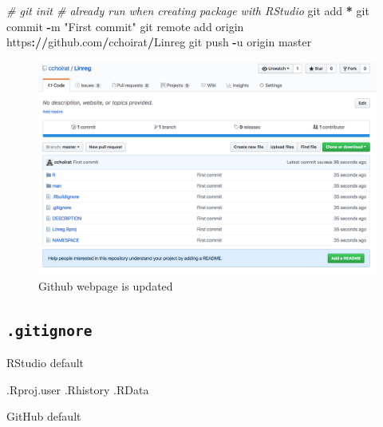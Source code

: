 \documentclass[]{book}
\newenvironment{Shaded}{\begin{snugshade}}{\end{snugshade}}
\newcommand{\StringTok}[1]{\textcolor[rgb]{0.31,0.60,0.02}{#1}}
\newcommand{\CommentTok}[1]{\textcolor[rgb]{0.56,0.35,0.01}{\textit{#1}}}
\newcommand{\OperatorTok}[1]{\textcolor[rgb]{0.81,0.36,0.00}{\textbf{#1}}}
\newcommand{\ErrorTok}[1]{\textcolor[rgb]{0.64,0.00,0.00}{\textbf{#1}}}
\newcommand{\NormalTok}[1]{#1}
\theoremstyle{definition}
\theoremstyle{definition}
\theoremstyle{definition}
\theoremstyle{remark}
\begin{document}
\begin{Shaded}
\begin{Highlighting}[]
\CommentTok{# git init # already run when creating package with RStudio}
\NormalTok{git add }\OperatorTok{*}
\NormalTok{git commit }\OperatorTok{-}\NormalTok{m }\StringTok{"First commit"}
\NormalTok{git remote add origin https}\OperatorTok{:}\ErrorTok{//}\NormalTok{github.com}\OperatorTok{/}\NormalTok{cchoirat}\OperatorTok{/}\NormalTok{Linreg}
\NormalTok{git push }\OperatorTok{-}\NormalTok{u origin master}
\end{Highlighting}
\end{Shaded}

\begin{figure}

{\centering \includegraphics[width=21.1in]{images/ch3_pkg_9_github} 

}

\caption{Github webpage is updated}\label{fig:pkg9}
\end{figure}

\subsection{\texorpdfstring{\texttt{.gitignore}}{.gitignore}}\label{gitignore}

RStudio default

\begin{Shaded}
\begin{Highlighting}[]
\NormalTok{.Rproj.user}
\NormalTok{.Rhistory}
\NormalTok{.RData}
\end{Highlighting}
\end{Shaded}

GitHub default
\end{document}
